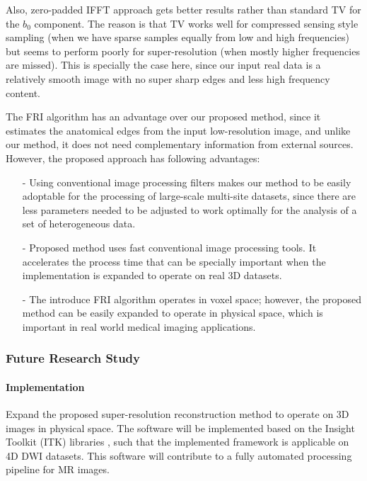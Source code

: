 Also, zero-padded IFFT approach gets better results rather than standard TV for the $b_0$ component. The reason is that TV works well for compressed sensing style sampling (when we have sparse samples equally from low and high frequencies) but seems to perform poorly for super-resolution (when mostly higher frequencies are missed). This is specially the case here, since our input real data is a relatively smooth image with no super sharp edges and less high frequency content.

The FRI algorithm has an advantage over our proposed method, since it estimates the anatomical edges from the input low-resolution image, and unlike our method, it does not need complementary information from external sources. However, the proposed approach has following advantages:
\begin{itemize}
\item[-] Using conventional image processing filters makes our method to be easily adoptable for the processing of large-scale multi-site datasets, since there are less parameters needed to be adjusted to work optimally for the analysis of a set of heterogeneous data.
\item[-] Proposed method uses fast conventional image processing tools. It accelerates the process time that can be specially important when the implementation is expanded to operate on real 3D datasets.
\item[-] The introduce FRI algorithm operates in voxel space; however, the proposed method can be easily expanded to operate in physical space, which is important in real world medical imaging applications.
\end{itemize}

\subsubsection{Future Research Study}

\paragraph{Implementation}

Expand the proposed super-resolution reconstruction method to operate on 3D images in physical space.
The software will be implemented based on the Insight Toolkit (ITK) libraries \cite{johnson2015itk1, johnson2015itk2}, such that the implemented framework is applicable on 4D DWI datasets. This software will contribute to a fully automated processing pipeline for MR images.

